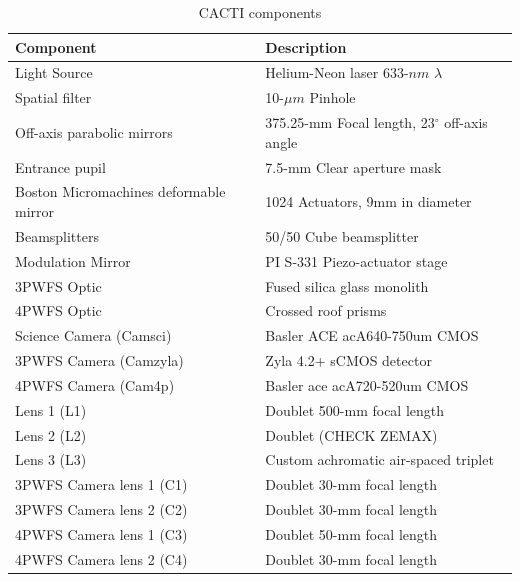 \documentclass[12pt]{spieman}  %
\begin{document}
\begin{spacing}{2}
\begin{table}
	\begin{center}
		\begin{tabular}{ | l| l | }
			\hline
			\textbf{Component}& \textbf{Description}\\ \hline
			Light Source & Helium-Neon laser 633-$nm$ $\lambda$\\ \hline
			Spatial filter & 10-$\mu m$ Pinhole \\ \hline
			Off-axis parabolic mirrors & 375.25-mm Focal length, 23$^{\circ}$ off-axis angle \\ \hline
            Entrance pupil & 7.5-mm Clear aperture mask \\ \hline
            Boston Micromachines deformable mirror & 1024 Actuators, 9mm in diameter \\ \hline
            Beamsplitters & 50/50 Cube beamsplitter \\ \hline
            Modulation Mirror &  PI S-331 Piezo-actuator stage \\ \hline
            3PWFS Optic & Fused silica glass monolith \\ \hline
            4PWFS Optic & Crossed roof prisms \\ \hline
            Science Camera (Camsci) & Basler ACE acA640-750um CMOS\\ \hline
            3PWFS Camera (Camzyla) & Zyla 4.2+ sCMOS detector \\ \hline
            4PWFS Camera (Cam4p) & Basler ace acA720-520um CMOS \\ \hline
            Lens 1 (L1) & Doublet 500-mm focal length  \\ \hline
            Lens 2 (L2) & Doublet (CHECK ZEMAX)  \\ \hline
            Lens 3 (L3) & Custom achromatic air-spaced triplet  \\ \hline
            3PWFS Camera lens 1 (C1) & Doublet 30-mm focal length \\ \hline
            3PWFS Camera lens 2 (C2) & Doublet 30-mm focal length \\ \hline
            4PWFS Camera lens 1 (C3) & Doublet 50-mm focal length \\ \hline
            4PWFS Camera lens 2 (C4) & Doublet 30-mm focal length \\ \hline
				
			\end{tabular}
		\end{center}
	\caption{CACTI components}
	\label{tab:CACTItable}
\end{table}


\end{spacing}
\end{document}
